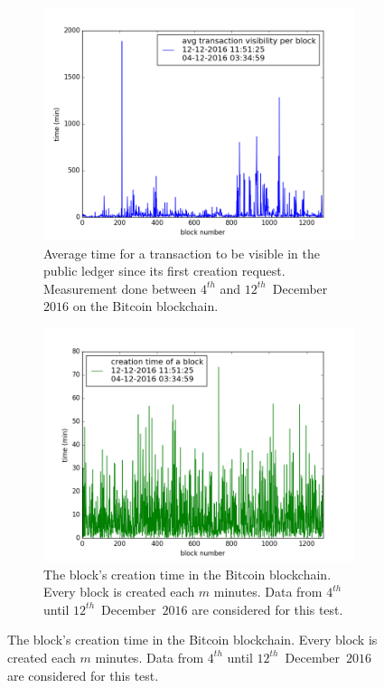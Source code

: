 \documentclass[USenglish]{uit-thesis}
\begin{document}
\begin{figure}[H]
		\centering
	\begin{subfigure}{.7\textwidth}
		\centering
		\includegraphics[width=1\linewidth]{img/transaction_visibility}
		\caption{Average time for a transaction to be visible in the public ledger since
			its first creation request.
			Measurement done between $4^{th}$ and $12^{th}$~December~$2016$ on the
			Bitcoin blockchain.}
		\label{fig:transaction_visibility}
	\end{subfigure}%

	\begin{subfigure}{.7\textwidth}
		\centering
	\includegraphics[width=1\textwidth]{img/time_per_block}
	\caption{The block's creation time in the Bitcoin blockchain. Every block is
		created each $m$ minutes. Data from $4^{th}$ until $12^{th}$~December~$2016$ are
		considered for this test.}
	\label{fig:time_per_block}
	\end{subfigure}
	

\end{figure}
\end{document}

